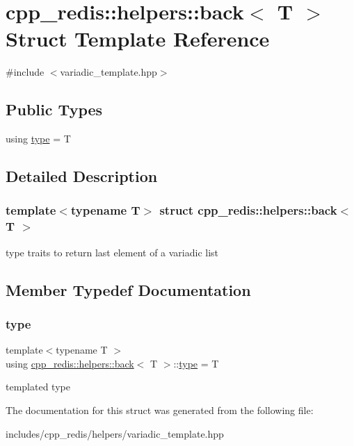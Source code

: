 \hypertarget{structcpp__redis_1_1helpers_1_1back_3_01_t_01_4}{}\section{cpp\+\_\+redis\+:\+:helpers\+:\+:back$<$ T $>$ Struct Template Reference}
\label{structcpp__redis_1_1helpers_1_1back_3_01_t_01_4}


{\ttfamily \#include $<$variadic\+\_\+template.\+hpp$>$}

\subsection*{Public Types}
\begin{DoxyCompactItemize}
\item 
using \hyperlink{structcpp__redis_1_1helpers_1_1back_3_01_t_01_4_a87d10cfacd8ca29b083dc5688e77f87c}{type} = T
\end{DoxyCompactItemize}


\subsection{Detailed Description}
\subsubsection*{template$<$typename T$>$\newline
struct cpp\+\_\+redis\+::helpers\+::back$<$ T $>$}

type traits to return last element of a variadic list 

\subsection{Member Typedef Documentation}
\mbox{\label{structcpp__redis_1_1helpers_1_1back_3_01_t_01_4_a87d10cfacd8ca29b083dc5688e77f87c}} 
\subsubsection{\texorpdfstring{type}{type}}
{\footnotesize\ttfamily template$<$typename T $>$ \\
using \hyperlink{structcpp__redis_1_1helpers_1_1back}{cpp\+\_\+redis\+::helpers\+::back}$<$ T $>$\+::\hyperlink{structcpp__redis_1_1helpers_1_1back_3_01_t_01_4_a87d10cfacd8ca29b083dc5688e77f87c}{type} =  T}

templated type 

The documentation for this struct was generated from the following file\+:\begin{DoxyCompactItemize}
\item 
includes/cpp\+\_\+redis/helpers/variadic\+\_\+template.\+hpp\end{DoxyCompactItemize}
